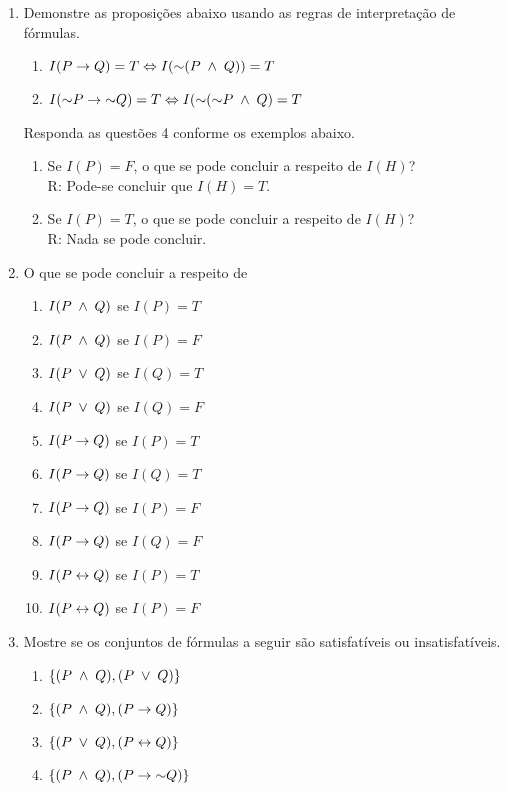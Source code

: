\begin{enumerate}
  \item Demonstre as proposições abaixo usando as regras de interpretação de fórmulas.
    \begin{enumerate}
      \item $I(P \rightarrow Q) = T \Leftrightarrow I(\mathord{\sim} ( P \;\land\; Q)) = T$
      \item $I(\mathord{\sim} P \rightarrow \mathord{\sim} Q) = T \Leftrightarrow I(\mathord{\sim} (\mathord{\sim} P \;\land\; Q) = T$
    \end{enumerate}
  \noindent
  Responda as questões 4 conforme os exemplos abaixo.
    \begin{enumerate}
      \item Se $I(P) = F$, o que se pode concluir a respeito de $I(H)$?\\
        R: Pode-se concluir que $I(H) = T$.
      \item Se $I(P) = T$, o que se pode concluir a respeito de $I(H)$?\\
        R: Nada se pode concluir.
    \end{enumerate}
  \item O que se pode concluir a respeito de
    \begin{enumerate}
      \item $I(P \;\land\; Q)$ se $I(P) = T$
      \item $I(P \;\land\; Q)$ se $I(P) = F$
      \item $I(P \;\lor\; Q)$  se $I(Q) = T$
      \item $I(P \;\lor\; Q)$  se $I(Q) = F$
      \item $I(P \rightarrow Q)$ se $I(P) = T$
      \item $I(P \rightarrow Q)$ se $I(Q) = T$
      \item $I(P \rightarrow Q)$ se $I(P) = F$
      \item $I(P \rightarrow Q)$ se $I(Q) = F$
      \item $I(P \leftrightarrow Q)$ se $I(P) = T$
      \item $I(P \leftrightarrow Q)$ se $I(P) = F$
    \end{enumerate}

  \item Mostre se os conjuntos de fórmulas a seguir são satisfatíveis ou insatisfatíveis.
    \begin{enumerate}
      \item $\{ (P \;\land\; Q), (P \;\lor\; Q) \}$
      \item $\{ (P \;\land\; Q), (P \rightarrow Q) \}$
      \item $\{ (P \;\lor\; Q),  (P \leftrightarrow Q) \}$
      \item $\{ (P \;\land\; Q), (P \rightarrow \mathord{\sim} Q) \}$
    \end{enumerate}


\end{enumerate}
